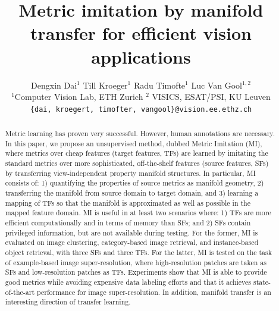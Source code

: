 \documentclass[10pt,twocolumn,letterpaper]{article}
\begin{document}
\title{Metric imitation by manifold transfer for
  efficient vision applications}

\author{
Dengxin Dai$^1$ \quad \quad Till Kroeger$^1$ \quad \quad Radu Timofte$^1$ \quad \quad Luc Van Gool$^{1,2}$\\
$^1$Computer Vision Lab, ETH Zurich  \quad  $^2$ VISICS, ESAT/PSI, KU Leuven\\
{\tt\small \{dai, kroegert, timofter, vangool\}@vision.ee.ethz.ch}
}

\maketitle

\begin{abstract}

  Metric learning has proven very successful. However, human annotations are necessary. 
  In this paper, we propose an
  unsupervised method, dubbed Metric Imitation (MI), where metrics
  over cheap features (target features, TFs) are learned by imitating the
  standard metrics over more sophisticated, off-the-shelf features (source features, SFs) by transferring
  view-independent property manifold structures. In particular, MI
  consists of: 1) quantifying the properties of source metrics as
  manifold geometry, 2) transferring the manifold from source domain
  to target domain, and 3) learning a mapping of TFs so that the
  manifold is approximated as well as possible in the mapped feature
  domain. MI is useful in at least two scenarios where: 1) TFs are
  more efficient computationally and in terms of memory than SFs; and
  2) SFs contain privileged information, but are not available
  during testing. For the former, MI is evaluated on image clustering,
  category-based image retrieval, and instance-based object retrieval,
  with three SFs and three TFs. For the latter, MI is tested on the
  task of example-based image super-resolution, where high-resolution
  patches are taken as SFs and low-resolution patches as
  TFs. Experiments show that MI is able to provide good metrics while
  avoiding expensive data labeling efforts and that it achieves
  state-of-the-art performance for image super-resolution. In
  addition, manifold transfer is an interesting direction of transfer
  learning.


  
\end{abstract}
\end{document}
